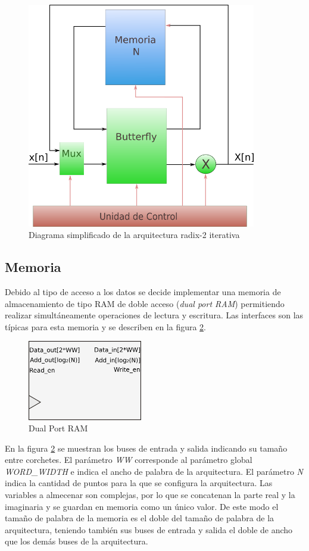 \begin{figure}[htb!]
        \centering
        \includegraphics[width=10cm]{./figures/radix2blocks.png}
        \caption{Diagrama simplificado de la arquitectura radix-2 iterativa}
        \label{fig:radix2blocks}
\end{figure}

\subsection{Memoria} \label{sec:r2mem}

Debido al tipo de acceso a los datos se decide implementar una memoria de almacenamiento de tipo
RAM de doble acceso (\textit{dual port RAM}) permitiendo realizar simultáneamente operaciones de lectura y escritura. Las interfaces son las típicas para
esta memoria y se describen en la figura \ref{fig:dualPortRam}.

\begin{figure}[htb!]
        \centering
        \includegraphics[width=5cm]{./figures/dportRam.png}
        \caption{Dual Port RAM}
        \label{fig:dualPortRam}
\end{figure}

En la figura \ref{fig:dualPortRam} se muestran los buses de entrada y salida indicando su tamaño
entre corchetes.
El parámetro \textit{WW} corresponde al parámetro global \textit{WORD\_WIDTH} e indica el ancho de palabra de la
arquitectura. El parámetro \textit{N} indica la cantidad de puntos para la que se configura la
arquitectura. Las variables a almecenar son complejas, por lo que se concatenan la parte real y la
imaginaria y se guardan en memoria como un único valor. De este modo el tamaño de palabra de la 
memoria es el doble del tamaño de palabra de la arquitectura, teniendo también sus buses de entrada 
y salida el doble de ancho que los demás buses de la arquitectura.

